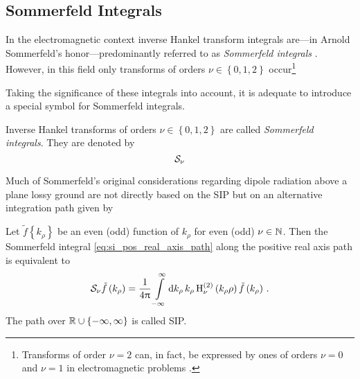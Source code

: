 \subsection{Sommerfeld Integrals}

In the electromagnetic context inverse Hankel transform integrals
are---in Arnold Sommerfeld's honor---predominantly referred to
as \emph{Sommerfeld integrals} \cite{Sommerfeld1909, Mosig2021}.
However, in this field only transforms of orders
$\nu \in \left\{0, 1, 2\right\}$ occur\footnote{Transforms of order $\nu = 2$
can, in fact, be expressed by ones of orders $\nu = 0$ and $\nu = 1$ in
electromagnetic problems \cite{Michalski2005}.}

Taking the significance of these integrals into account, it is adequate to
introduce a special symbol for Sommerfeld integrals.
\begin{definition}	
	Inverse Hankel transforms of orders $\nu \in \left\{0, 1, 2\right\}$
	are called \emph{Sommerfeld integrals}.
	They are denoted by
	\begin{equation}\label{eq:si_pos_real_axis_path}
		\mathcal{S}_{\nu}
	\end{equation}
\end{definition}

Much of Sommerfeld's original considerations \cite{Sommerfeld1909} regarding
dipole radiation above a plane lossy ground are not directly based on the
\ac{SIP} but on an alternative integration path given by
\begin{corollary}
	Let $\tilde{f} \left\{k_\rho\right\}$ be an even (odd) function of $k_\rho$
	for even (odd) $\nu \in \mathbb{N}$.
	Then the Sommerfeld integral \eqref{eq:si_pos_real_axis_path}
	along the positive real axis path is equivalent to
	\begin{equation}\label{eq:si_sommerfeld_intgration_path}
		\mathcal{S}_{\nu}{\tilde{f} \left( k_\rho \right)} =
		\frac{1}{4\uppi}
		\int\limits_{-\infty}^{\infty} \mathrm{d} k_\rho \, k_\rho
		\operatorname{H}_{\nu}^{\left( 2 \right)} \left(k_\rho \rho\right)
		\tilde{f} \left(k_\rho\right) \, .
	\end{equation}
	The path over $\mathbb{R} \cup \left\{-\infty, \infty\right\}$
	is called \acf{SIP}\cite[p.~66]{Chew1999}.
\end{corollary}

